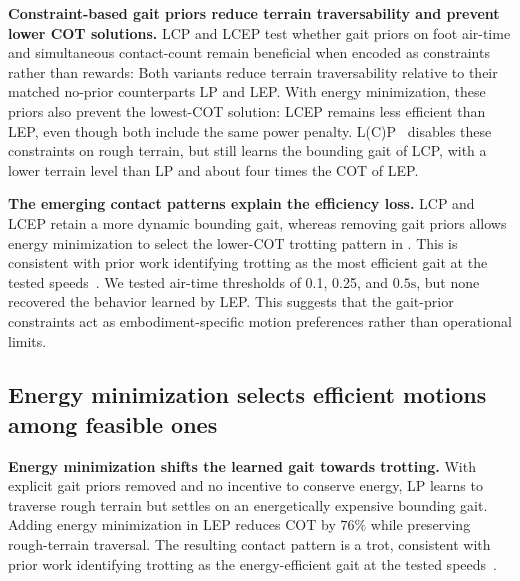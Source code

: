 \documentclass{article}
\newcommand{\baselineOne}{LCP}
\newcommand{\baselineTwo}{LP}
\newcommand{\baselineThree}{LCEP}
\newcommand{\baselineFour}{LEP}
\begin{document}
    \textbf{Constraint-based gait priors reduce terrain traversability and prevent lower COT solutions.}
    \baselineOne{} and \baselineThree{} test whether gait priors on foot air-time and simultaneous contact-count remain beneficial when encoded as constraints rather than rewards: Both variants reduce terrain traversability relative to their matched no-prior counterparts \baselineTwo{} and \baselineFour. With energy minimization, these priors also prevent the lowest-COT solution: \baselineThree{} remains less efficient than \baselineFour{}, even though both include the same power penalty. L(C)P~\citep{chane-saneCaTConstraintsTerminations2024a} disables these constraints on rough terrain, but still learns the bounding gait of \baselineOne{}, with a lower terrain level than \baselineTwo{} and about four times the COT of \baselineFour{}.
    
    \textbf{The emerging contact patterns explain the efficiency loss.} \baselineOne{} and \baselineThree{} retain a more dynamic bounding gait, whereas removing gait priors allows energy minimization to select the lower-COT trotting pattern in . This is consistent with prior work identifying trotting as the most efficient gait at the tested speeds~\citep{xiSelectingGaitsEconomical2016,yangFastEfficientLocomotion2022}. We tested air-time thresholds of 0.1, 0.25, and \(0.5\mathrm{s}\), but none recovered the behavior learned by \baselineFour{}. This suggests that the gait-prior constraints act as embodiment-specific motion preferences rather than operational limits.
    
    \subsection{Energy minimization selects efficient motions among feasible ones}
    \label{sec:results-energy}

    \textbf{Energy minimization shifts the learned gait towards trotting.}
    With explicit gait priors removed and no incentive to conserve energy, \baselineTwo{} learns to traverse rough terrain but settles on an energetically expensive bounding gait. 
    Adding energy minimization in \baselineFour{} reduces COT by \(76\%\) while preserving rough-terrain traversal. The resulting contact pattern is a trot, consistent with prior work identifying trotting as the energy-efficient gait at the tested speeds~\citep{xiSelectingGaitsEconomical2016,yangFastEfficientLocomotion2022}.
\end{document}
